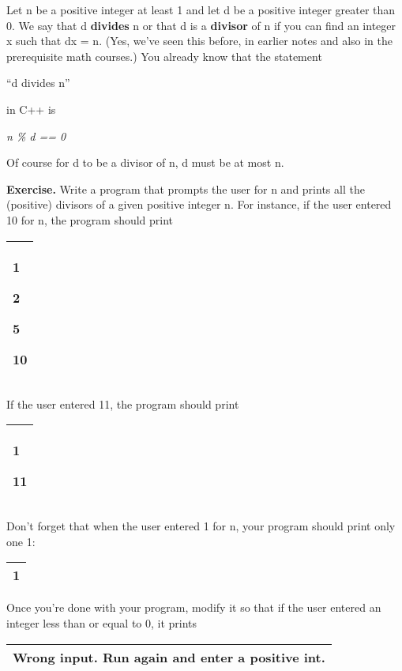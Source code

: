 \documentclass[
]{article}
\begin{document}
Let n be a positive integer at least 1 and let d be a positive integer
greater than 0. We say that d \textbf{divides} n or that d is a
\textbf{divisor} of n if you can find an integer x such that dx = n.
(Yes, we've seen this before, in earlier notes and also in the
prerequisite math courses.) You already know that the statement

``d divides n''

in C++ is

\emph{n \% d == 0}

Of course for d to be a divisor of n, d must be at most n.

\textbf{Exercise.} Write a program that prompts the user for n and
prints all the (positive) divisors of a given positive integer n. For
instance, if the user entered 10 for n, the program should print

\begin{longtable}[]{@{}l@{}}
\toprule
\endhead
\begin{minipage}[t]{0.97\columnwidth}\raggedright
1

2

5

10\strut
\end{minipage}\tabularnewline
\bottomrule
\end{longtable}

If the user entered 11, the program should print

\begin{longtable}[]{@{}l@{}}
\toprule
\endhead
\begin{minipage}[t]{0.97\columnwidth}\raggedright
1

11\strut
\end{minipage}\tabularnewline
\bottomrule
\end{longtable}

Don't forget that when the user entered 1 for n, your program should
print only one 1:

\begin{longtable}[]{@{}l@{}}
\toprule
\endhead
1\tabularnewline
\bottomrule
\end{longtable}

Once you're done with your program, modify it so that if the user
entered an integer less than or equal to 0, it prints

\begin{longtable}[]{@{}l@{}}
\toprule
\endhead
Wrong input. Run again and enter a positive int.\tabularnewline
\bottomrule
\end{longtable}
\end{document}
